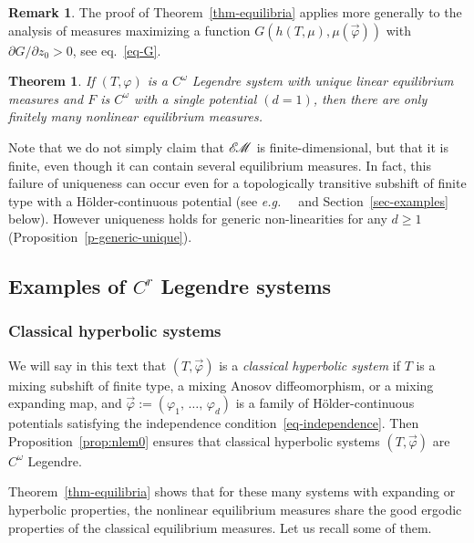 \documentclass[10pt]{amsart}
\theoremstyle{definition}\newtheorem{defi}[theo]{Definition}\newtheorem{rema}[theo]{Remark}\newtheorem{exam}[theo]{Example}\newtheorem{exem}[theo]{Example}\newtheorem{nota}[theo]{Notation}
\theoremstyle{plain}
\newtheorem{theol}{Theorem}
\theoremstyle{plain}
\newcommand*\eg{{\it e.g.\ }}
\newcommand{\EM}{\mathscr{E\kern-2pt M}}
\newcommand{\pot}{\varphi}
\newcounter{In}
\newcommand*\8{\infty}
\begin{document}
\begin{rema}
The proof of Theorem~\ref{thm-equilibria} applies more generally to the analysis of measures maximizing a function $G(h(T,\mu),\mu(\vec\pot))$ with $\partial G/\partial z_0>0$, see eq.~\eqref{eq-G}.
\end{rema}
%

\begin{theol}\label{thm-finiteness}
If $(T,\pot)$ is a $C^\omega$ Legendre system with unique linear equilibrium measures and $F$ is $C^\omega$ with a single potential $(d=1)$, then there are only finitely many nonlinear equilibrium measures.
\end{theol}

Note that we do not simply claim that $\EM$ is finite-dimensional, but that it is finite, even though it can contain several equilibrium measures. In fact, this failure of uniqueness can occur even for a topologically transitive subshift of finite type with a H\"older-continuous potential (see \eg~\cite{Leplaideur-Watbled} and Section~\ref{sec-examples} below). However uniqueness holds for generic non-linearities for any $d\ge1$ (Proposition~\ref{p-generic-unique}).


\subsection{Examples of \texorpdfstring{$C^r$}{Cr} Legendre systems}\label{sec-examples-sys}

\subsubsection{Classical hyperbolic systems}

We will say in this text that $(T,\vec\pot)$ is a \emph{classical hyperbolic system} if $T$ is a mixing subshift of finite type, a mixing Anosov diffeomorphism, or a mixing expanding map, and $\vec\pot:=(\pot_1,\,\dots,\,\pot_d)$ is a family of H\"older-continuous potentials satisfying the independence condition~\eqref{eq-independence}. Then Proposition~\ref{prop:nlem0} ensures that classical hyperbolic systems $(T,\vec\pot)$ are $C^\omega$ Legendre.

Theorem~\ref{thm-equilibria} shows that for these many systems with expanding or hyperbolic properties, the nonlinear equilibrium measures share the good ergodic properties of the classical equilibrium measures. Let us recall some of them.
\end{document}
